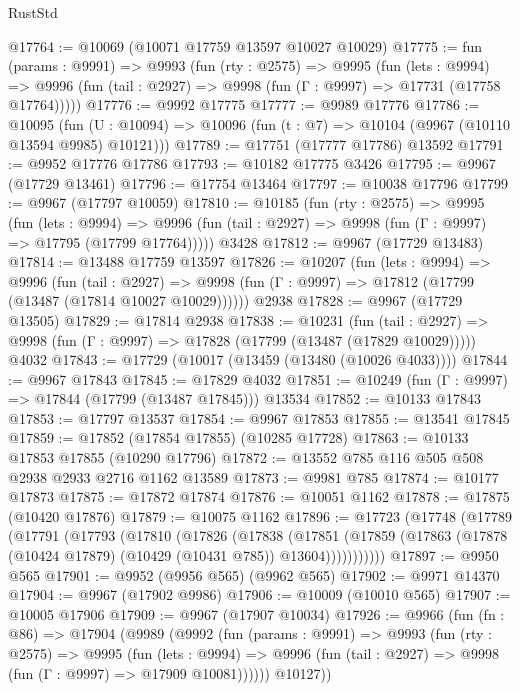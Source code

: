 \begin{lexlean}{RustStd}
\begin{coremodule}
@17764 := @10069 (@10071 @17759 @13597 @10027 @10029)
@17775 := fun (params : @9991) =>
  @9993
    (fun (rty : @2575) =>
    @9995
      (fun (lets : @9994) =>
      @9996 (fun (tail : @2927) => @9998 (fun (Γ : @9997) => @17731 (@17758 @17764)))))
@17776 := @9992 @17775
@17777 := @9989 @17776
@17786 := @10095
    (fun (U : @10094) => @10096 (fun (t : @7) => @10104 (@9967 (@10110 @13594 @9985) @10121)))
@17789 := @17751 (@17777 @17786) @13592
@17791 := @9952 @17776 @17786
@17793 := @10182 @17775 @3426
@17795 := @9967 (@17729 @13461)
@17796 := @17754 @13464
@17797 := @10038 @17796
@17799 := @9967 (@17797 @10059)
@17810 := @10185
    (fun (rty : @2575) =>
    @9995
      (fun (lets : @9994) =>
      @9996 (fun (tail : @2927) => @9998 (fun (Γ : @9997) => @17795 (@17799 @17764)))))
    @3428
@17812 := @9967 (@17729 @13483)
@17814 := @13488 @17759 @13597
@17826 := @10207
    (fun (lets : @9994) =>
    @9996
      (fun (tail : @2927) =>
      @9998 (fun (Γ : @9997) => @17812 (@17799 (@13487 (@17814 @10027 @10029))))))
    @2938
@17828 := @9967 (@17729 @13505)
@17829 := @17814 @2938
@17838 := @10231
    (fun (tail : @2927) => @9998 (fun (Γ : @9997) => @17828 (@17799 (@13487 (@17829 @10029)))))
    @4032
@17843 := @17729 (@10017 (@13459 (@13480 (@10026 @4033))))
@17844 := @9967 @17843
@17845 := @17829 @4032
@17851 := @10249 (fun (Γ : @9997) => @17844 (@17799 (@13487 @17845))) @13534
@17852 := @10133 @17843
@17853 := @17797 @13537
@17854 := @9967 @17853
@17855 := @13541 @17845
@17859 := @17852 (@17854 @17855) (@10285 @17728)
@17863 := @10133 @17853 @17855 (@10290 @17796)
@17872 := @13552 @785 @116 @505 @508 @2938 @2933 @2716 @1162 @13589
@17873 := @9981 @785
@17874 := @10177 @17873
@17875 := @17872 @17874
@17876 := @10051 @1162
@17878 := @17875 (@10420 @17876)
@17879 := @10075 @1162
@17896 := @17723
    (@17748
      (@17789
        (@17791
          (@17793
            (@17810
              (@17826
                (@17838
                  (@17851
                    (@17859 (@17863 (@17878 (@10424 @17879) (@10429 (@10431 @785)) @13604)))))))))))
@17897 := @9950 @565
@17901 := @9952 (@9956 @565) (@9962 @565)
@17902 := @9971 @14370
@17904 := @9967 (@17902 @9986)
@17906 := @10009 (@10010 @565)
@17907 := @10005 @17906
@17909 := @9967 (@17907 @10034)
@17926 := @9966
    (fun (fn : @86) =>
    @17904
      (@9989
        (@9992
          (fun (params : @9991) =>
          @9993
            (fun (rty : @2575) =>
            @9995
              (fun (lets : @9994) =>
              @9996 (fun (tail : @2927) => @9998 (fun (Γ : @9997) => @17909 @10081))))))
        @10127))

\end{coremodule}
\end{lexlean}

